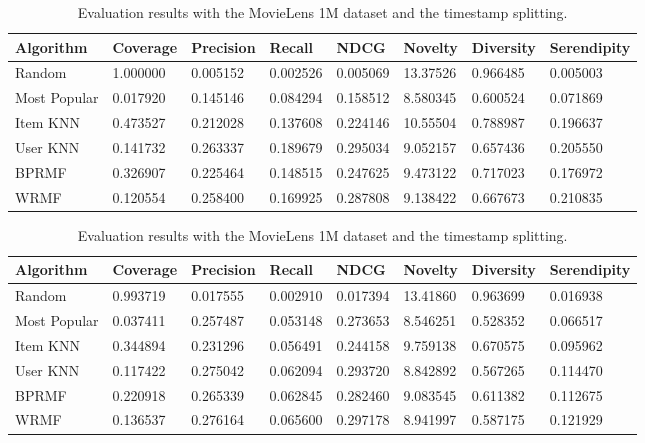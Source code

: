 \begin{table}
\centering
\begin{tabular}{@{}llllllll@{}}
\toprule
Algorithm    & Coverage & Precision & Recall   & NDCG     & Novelty  & Diversity & Serendipity \\ \midrule
Random       & 1.000000 & 0.005152  & 0.002526 & 0.005069 & 13.37526 & 0.966485  & 0.005003    \\
Most Popular & 0.017920 & 0.145146  & 0.084294 & 0.158512 & 8.580345 & 0.600524  & 0.071869    \\
Item KNN     & 0.473527 & 0.212028  & 0.137608 & 0.224146 & 10.55504 & 0.788987  & 0.196637    \\
User KNN     & 0.141732 & 0.263337  & 0.189679 & 0.295034 & 9.052157 & 0.657436  & 0.205550    \\
BPRMF        & 0.326907 & 0.225464  & 0.148515 & 0.247625 & 9.473122 & 0.717023  & 0.176972    \\
WRMF         & 0.120554 & 0.258400  & 0.169925 & 0.287808 & 9.138422 & 0.667673  & 0.210835    \\ \bottomrule
\end{tabular}
\caption[Evaluation with MovieLens 1M and random splitting]{Evaluation results with the MovieLens 1M dataset and a random splitting.}
\label{lab:tab:movielens-random}

\bigskip\bigskip

\begin{tabular}{@{}llllllll@{}}
\toprule
Algorithm    & Coverage & Precision & Recall   & NDCG     & Novelty  & Diversity & Serendipity \\ \midrule
Random       & 0.993719 & 0.017555  & 0.002910 & 0.017394 & 13.41860 & 0.963699  & 0.016938    \\
Most Popular & 0.037411 & 0.257487  & 0.053148 & 0.273653 & 8.546251 & 0.528352  & 0.066517    \\
Item KNN     & 0.344894 & 0.231296  & 0.056491 & 0.244158 & 9.759138 & 0.670575  & 0.095962    \\
User KNN     & 0.117422 & 0.275042  & 0.062094 & 0.293720 & 8.842892 & 0.567265  & 0.114470    \\
BPRMF        & 0.220918 & 0.265339  & 0.062845 & 0.282460 & 9.083545 & 0.611382  & 0.112675    \\
WRMF         & 0.136537 & 0.276164  & 0.065600 & 0.297178 & 8.941997 & 0.587175  & 0.121929    \\ \bottomrule
\end{tabular}
\caption[Evaluation with MovieLens 1M and timestamp splitting]{Evaluation results with the MovieLens 1M dataset and the timestamp splitting.}
\label{lab:tab:movielens-timestamp}
\end{table}

